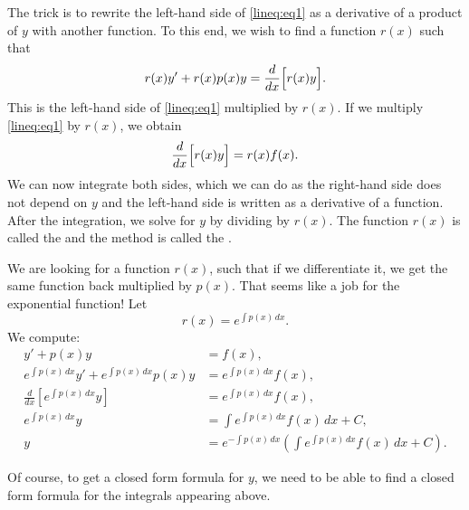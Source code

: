 The trick is to rewrite the left-hand side
of \eqref{lineq:eq1} as a derivative of a product of $y$ with another
function.
To this end,
we wish to find a function $r(x)$ such that
\begin{equation*}
r(x) y' + r(x) p(x) y = \frac{d}{dx}\Bigl[ r(x) y \Bigr] .
\end{equation*}
This is the left-hand side of
\eqref{lineq:eq1} multiplied by $r(x)$.  If we multiply \eqref{lineq:eq1} by
$r(x)$, we obtain
\begin{equation*}
\frac{d}{dx}\Bigl[ r(x) y \Bigr] = r(x)f(x) .
\end{equation*}
We can now integrate both sides, which we can do as
the right-hand side does not depend on $y$ and the left-hand side
is written as a derivative of a function.  After the integration, we solve for $y$
by dividing by $r(x)$.
The function $r(x)$ is called the \emph{} and the
method is called the \emph{}.

We are looking for a function $r(x)$, such that if
we differentiate it, we get the same function back multiplied by $p(x)$.
That seems like a job for the exponential function!  Let
\begin{equation*}
r(x) = e^{\int p(x) \,dx} .
\end{equation*}
We compute:
\begin{equation*}
\begin{aligned}
y' + p(x) y &= f(x) , \\
e^{\int p(x) \,dx} y' + e^{\int p(x) \,dx} p(x) y & = e^{\int p(x) \,dx} f(x) , \\
\frac{d}{dx}\left[ e^{\int p(x) \,dx} y \right] & = e^{\int p(x) \,dx} f(x) , \\
e^{\int p(x) \,dx} y & = \int e^{\int p(x) \,dx} f(x) \,dx + C , \\
y & = e^{-\int p(x) \,dx} \left( \int e^{\int p(x) \,dx} f(x) \,dx + C \right) .
\end{aligned}
\end{equation*}

Of course, to get a closed form formula for $y$,
we need to be able to find a
closed form formula for the integrals appearing above.

